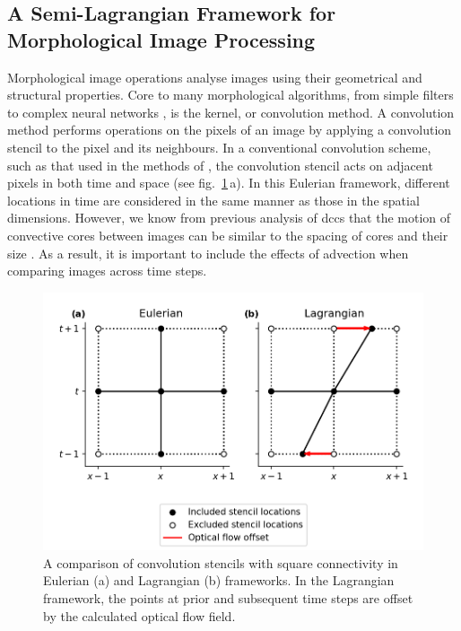 \subsection{A Semi-Lagrangian Framework for Morphological Image Processing}

Morphological image operations analyse images using their geometrical and structural properties.
Core to many morphological algorithms, from simple filters to complex neural networks \citep{kalchbrenner_convolutional_2014}, is the kernel, or convolution method.
A convolution method performs operations on the pixels of an image by applying a convolution stencil to the pixel and its neighbours.
In a conventional convolution scheme, such as that used in the methods of \citet{fiolleau_algorithm_2013}, the convolution stencil acts on adjacent pixels in both time and space (see fig.~\ref{fig:convolution_kernels}\,a).
In this Eulerian framework, different locations in time are considered in the same manner as those in the spatial dimensions.
However, we know from previous analysis of \acrshort{dcc}s that the motion of convective cores between images can be similar to the spacing of cores and their size \citep{heikenfeld_tobac_2019}.
As a result, it is important to include the effects of advection when comparing images across time steps.


\begin{figure}[tp]
    \includegraphics[width=\textwidth]{figures/chapter1_15.png}
    \caption[
    A comparison of convolution stencils with square connectivity in Eulerian and Lagrangian frameworks.
    ]{
    A comparison of convolution stencils with square connectivity in Eulerian (a) and Lagrangian (b) frameworks. In the Lagrangian framework, the points at prior and subsequent time steps are offset by the calculated optical flow field.
    }
    \label{fig:convolution_kernels}
\end{figure}


